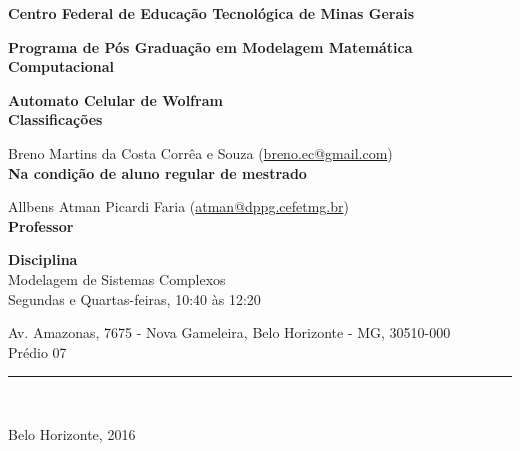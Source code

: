 
\hypersetup{pageanchor=false}

\begin{titlepage}
  \begin{center}
    {\large
    \textbf{Centro Federal de Educação Tecnológica de Minas Gerais}
    }

    \vspace{0.5cm}

    {\normalsize
    \textbf{Programa de Pós Graduação em Modelagem Matemática Computacional}
    }

    \vspace{2.5cm}

    {\LARGE \textbf{Automato Celular de Wolfram}} \\
    \vspace{0.5cm}
    {\Large \textbf{Classificações}}

    \vspace{3.5cm}
  \end{center}

  Breno Martins da Costa Corrêa e Souza
  (\href{mailto:breno.ec@gmail.com}{breno.ec@gmail.com}) \\
  \indent \textbf{Na condição de aluno regular de mestrado}

  \vspace{1cm}

  Allbens Atman Picardi Faria
  (\href{mailto:atman@dppg.cefetmg.br}{atman@dppg.cefetmg.br}) \\
  \indent \textbf{Professor}

  \vspace{1cm}

  \begin{center}
    \textbf{Disciplina} \\
    Modelagem de Sistemas Complexos \\
    Segundas e Quartas-feiras, 10:40 às 12:20 \\

    \vspace{1cm}

    Av.  Amazonas, 7675 - Nova Gameleira, Belo Horizonte - MG, 30510-000 \\
    Prédio 07 \\

    \vspace{3.5cm}

    \rule[1pt]{360pt}{1pt} \\

    \vspace{0.5cm}

    Belo Horizonte, 2016

  \end{center}

  \pagebreak
\end{titlepage}

\hypersetup{pageanchor=true}
